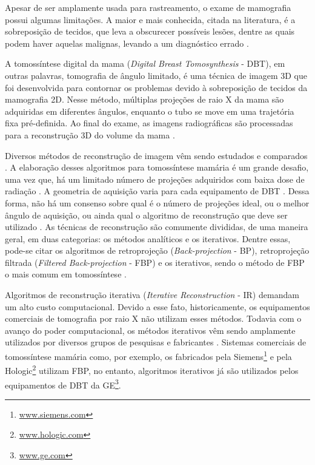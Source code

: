 Apesar de ser amplamente usada para rastreamento, o exame de mamografia possui algumas limitações. A maior e mais conhecida, citada na literatura, é a sobreposição de tecidos, que leva a obscurecer possíveis lesões, dentre as quais podem haver aquelas malignas, levando a um diagnóstico errado \cite{vedantham2015digital}. 

A tomossíntese digital da mama (\textit{Digital Breast Tomosynthesis} - \acs{DBT}), em outras palavras, tomografia de ângulo limitado, é uma técnica de imagem 3D que foi desenvolvida para contornar os problemas devido à sobreposição de tecidos da mamografia \acs{2D}. Nesse método, múltiplas projeções de raio X da mama são adquiridas em diferentes ângulos, enquanto o tubo se move em uma trajetória fixa pré-definida. Ao final do exame, as imagens radiográficas são processadas para a reconstrução \acs{3D} do volume da mama \cite{vedantham2015digital}.  

Diversos métodos de reconstrução de imagem vêm sendo estudados e comparados \cite{wu2004comparison,zhang2006comparative}. A elaboração desses algoritmos para tomossíntese mamária é um grande desafio, uma vez que, há um limitado número de projeções adquiridos com baixa dose de radiação \cite{wu2004comparison}. A geometria de aquisição varia para cada equipamento de \acs{DBT} \cite{vedantham2015digital}. Dessa forma, não há um consenso sobre qual é o número de projeções ideal, ou o melhor ângulo de aquisição, ou ainda qual o algoritmo de reconstrução que deve ser utilizado \cite{sechopoulos2009optimization}. As técnicas de reconstrução são comumente divididas, de uma maneira geral, em duas categorias: os métodos analíticos e os iterativos. Dentre essas, pode-se citar os algoritmos de retroprojeção (\textit{Back-projection} - \acs{BP}), retroprojeção filtrada (\textit{Filtered Back-projection} - \acs{FBP}) e os iterativos, sendo o método de \acs{FBP} o mais comum em tomossíntese \cite{zheng2018detector}.  

Algoritmos de reconstrução iterativa (\textit{Iterative Reconstruction} - \acs{IR}) demandam um alto custo computacional. Devido a esse fato, historicamente, os equipamentos comerciais de tomografia por raio X não utilizam esses métodos. Todavia com o avanço do poder computacional, os métodos iterativos vêm sendo  amplamente utilizados por diversos grupos de pesquisas e fabricantes \cite{wu2003tomographic}. Sistemas comerciais de tomossíntese mamária como, por exemplo, os fabricados pela Siemens\footnote{\url{www.siemens.com}} e pela Hologic\footnote{\url{www.hologic.com}} utilizam \acs{FBP}, no entanto, algoritmos iterativos já são utilizados pelos equipamentos de \acs{DBT} da \ac{GE}\footnote{\url{www.ge.com}}. 


